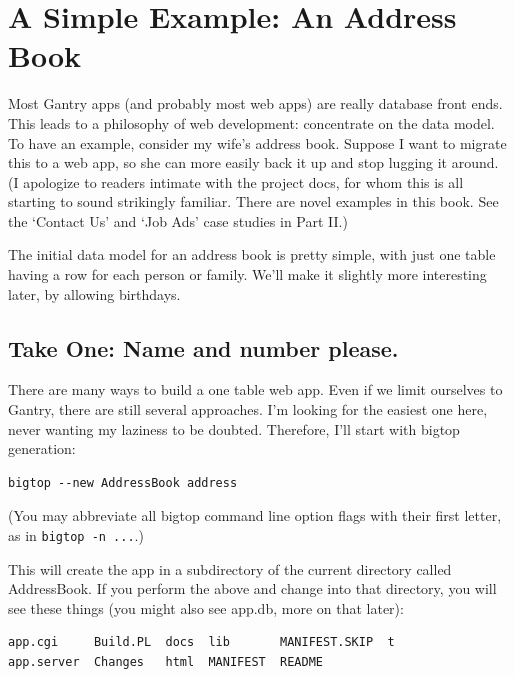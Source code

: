 \chapter{A Simple Example: An Address Book}
\label{chap:simpleex}

Most Gantry apps (and probably most web apps) are really database front ends.
This leads to a philosophy of web development: concentrate on the data model.
To have an example, consider my wife's address book.  Suppose I want to migrate
this to a web app, so she can more easily back it up and stop lugging it
around.  (I apologize to readers intimate with the project docs, for
whom this is all starting to sound strikingly familiar.  There are novel
examples in this book.  See the `Contact Us' and `Job Ads' case studies in
Part II.)

The initial data model for an address book is pretty simple, with just
one table having a row for each person or family.  We'll make it slightly
more interesting later, by allowing birthdays.

\section{Take One: Name and number please.}

There are many ways to build a one table web app.  Even if we limit ourselves
to Gantry, there are still several approaches.  I'm looking for the easiest
one here, never wanting my laziness to be doubted.  Therefore, I'll start with
bigtop generation:

\begin{verbatim}
bigtop --new AddressBook address
\end{verbatim}

(You may abbreviate all bigtop command line option flags with their first
letter, as in \verb+bigtop -n ...+.)

This will create the app in a subdirectory of the current directory
called AddressBook.  If you perform the above and change into that directory,
you will see these things (you might also see app.db, more on that later):

\begin{verbatim}
app.cgi     Build.PL  docs  lib       MANIFEST.SKIP  t
app.server  Changes   html  MANIFEST  README
\end{verbatim}


